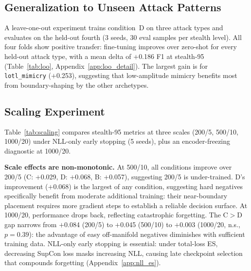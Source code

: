 \label{sec:experiments:constraints}

\subsection{Generalization to Unseen Attack Patterns}
\label{sec:experiments:loo}

A leave-one-out experiment trains condition~D on three attack types and
evaluates on the held-out fourth (3 seeds, 30 eval samples per stealth level).
All four folds show positive transfer: fine-tuning improves over zero-shot
for every held-out attack type, with a mean delta of $+$0.186 F1 at stealth-95
(Table~\ref{tab:loo}, Appendix~\ref{app:loo_detail}).
The largest gain is for \texttt{lotl\_mimicry} ($+$0.253), suggesting
that low-amplitude mimicry benefits most from boundary-shaping by
the other archetypes.

\subsection{Scaling Experiment}
\label{sec:experiments:scaling}

Table~\ref{tab:scaling} compares stealth-95 metrics at three scales
(200/5, 500/10, 1000/20) under NLL-only early stopping (5 seeds),
plus an encoder-freezing diagnostic at 1000/20.



\textbf{Scale effects are non-monotonic.}
At 500/10, all conditions improve over 200/5
(C: $+$0.029, D: $+$0.068, B: $+$0.057),
suggesting 200/5 is under-trained.
D's improvement ($+$0.068) is the largest of any condition, suggesting
hard negatives specifically benefit from moderate additional training: their
near-boundary placement requires more gradient steps to establish a reliable
decision surface.
At 1000/20, performance drops back, reflecting catastrophic forgetting.
The C$>$D gap narrows from $+$0.084 (200/5) to $+$0.045 (500/10) to
$+$0.003 (1000/20, n.s., $p{=}0.39$): the advantage of easy off-manifold negatives diminishes with sufficient training data.
NLL-only early stopping is essential: under total-loss ES, decreasing SupCon loss masks increasing NLL, causing late checkpoint selection that compounds forgetting (Appendix~\ref{app:nll_es}).

